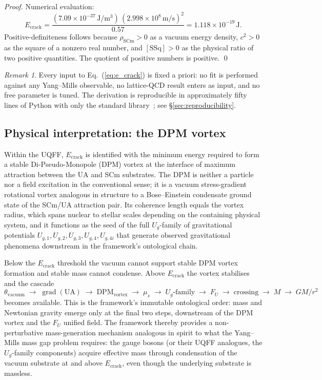 \documentclass[11pt,a4paper,onecolumn]{article}
\theoremstyle{plain}
\theoremstyle{definition}
\theoremstyle{remark}
\newtheorem{remark}[theorem]{Remark}
\begin{document}
\begin{proof}
Numerical evaluation:
\[
E_{\text{crack}}
  = \frac{(7.09 \times 10^{-37}\,\mathrm{J/m^3}) \,
          (2.998 \times 10^8\,\mathrm{m/s})^2}{0.57}
  = 1.118 \times 10^{-19}\,\mathrm{J}.
\]
Positive-definiteness follows because $\rho_{\mathrm{SCm}} > 0$ as a
vacuum energy density, $c^2 > 0$ as the square of a nonzero real
number, and $[\mathrm{SSq}] > 0$ as the physical ratio of two positive
quantities. The quotient of positive numbers is positive.
\qed
\end{proof}

\begin{remark}
Every input to Eq.~(\ref{eq:e_crack}) is fixed a priori: no fit is
performed against any Yang--Mills observable, no lattice-QCD result
enters as input, and no free parameter is tuned. The derivation is
reproducible in approximately fifty lines of Python with only the
standard library~\cite{murphy2026uqff}; see \S\ref{sec:reproducibility}.
\end{remark}

\subsection{Physical interpretation: the DPM vortex}

Within the UQFF, $E_{\text{crack}}$ is identified with the minimum
energy required to form a stable Di-Pseudo-Monopole (DPM) vortex at
the interface of maximum attraction between the UA and SCm
substrates. The DPM is neither a particle nor a field excitation in
the conventional sense; it is a vacuum stress-gradient rotational
vortex analogous in structure to a Bose--Einstein condensate ground
state of the SCm/UA attraction pair. Its coherence length equals the
vortex radius, which spans nuclear to stellar scales depending on the
containing physical system, and it functions as the seed of the full
$U_g$-family of gravitational potentials $U_{g,1}, U_{g,2}, U_{g,3},
U_{g,4}, U_{g,4i}$ that generate observed gravitational phenomena
downstream in the framework's ontological chain.

Below the $E_{\text{crack}}$ threshold the vacuum cannot support
stable DPM vortex formation and stable mass cannot condense. Above
$E_{\text{crack}}$ the vortex stabilises and the cascade
\[
\theta_{\text{vacuum}}
  \;\to\; \operatorname{grad}(\mathrm{UA})
  \;\to\; \mathrm{DPM}_{\text{vortex}}
  \;\to\; \mu_s
  \;\to\; U_g\text{-family}
  \;\to\; F_U
  \;\to\; \text{crossing}
  \;\to\; M
  \;\to\; GM/r^2
\]
becomes available. This is the framework's immutable ontological
order: mass and Newtonian gravity emerge only at the final two steps,
downstream of the DPM vortex and the $F_U$ unified field. The
framework thereby provides a non-perturbative mass-generation
mechanism analogous in spirit to what the Yang--Mills mass gap problem
requires: the gauge bosons (or their UQFF analogues, the $U_g$-family
components) acquire effective mass through condensation of the
vacuum substrate at and above $E_{\text{crack}}$, even though the
underlying substrate is massless.
\end{document}
